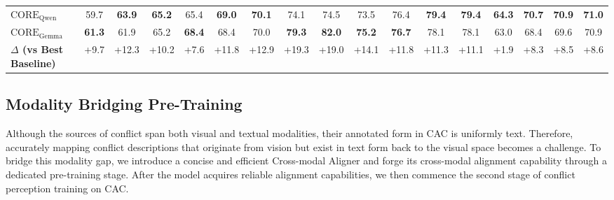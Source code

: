 \documentclass{article}
\theoremstyle{plain}
\theoremstyle{definition}
\theoremstyle{remark}
\begin{document}
\begin{table}
{\begin{tabular}{l cccc cccc cccc cccc}
\rowcolor{LightGreen}
\textbf{$\text{CORE}_\text{Qwen}$} & 59.7 & \textbf{63.9} & \textbf{65.2} & 65.4 & \textbf{69.0} & \textbf{70.1} & 74.1 & 74.5 & 73.5 & 76.4 & \textbf{79.4} & \textbf{79.4} & \textbf{64.3} & \textbf{70.7} & \textbf{70.9} & \textbf{71.0} \\
\rowcolor{LightGreen}
\textbf{$\text{CORE}_\text{Gemma}$} & \textbf{61.3} & 61.9 & 65.2 & \textbf{68.4} & 68.4 & 70.0 & \textbf{79.3} & \textbf{82.0} & \textbf{75.2} & \textbf{76.7} & 78.1 & 78.1 & 63.0 & 68.4 & 69.6 & 70.9 \\
\midrule

\textbf{$\Delta$ (vs Best Baseline)} & 
{\color{Red} +9.7} & %
{\color{Red} +12.3} & %
{\color{Red} +10.2} & %
{\color{Red} +7.6} & %
{\color{Red} +11.8} & %
{\color{Red} +12.9} & %
{\color{Red} +19.3} & %
{\color{Red} +19.0} & %
{\color{Red} +14.1} & %
{\color{Red} +11.8} & %
{\color{Red} +11.3} & %
{\color{Red} +11.1} & %
{\color{Red} +1.9} & %
{\color{Red} +8.3} & %
{\color{Red} +8.5} & %
{\color{Red} +8.6} \\ %
\bottomrule
\end{tabular}}
\small
\label{tab:0.1k-2.5k}
\vspace{-0.1cm}
\end{table}
\subsection{Modality Bridging Pre-Training}
Although the sources of conflict span both visual and textual modalities, their annotated form in CAC is uniformly text. Therefore, accurately mapping conflict descriptions that originate from vision but exist in text form back to the visual space becomes a challenge. To bridge this modality gap, we introduce a concise and efficient Cross-modal Aligner and forge its cross-modal alignment capability through a dedicated pre-training stage. 
After the model acquires reliable alignment capabilities, we then commence the second stage of conflict perception training on CAC.
\end{document}
